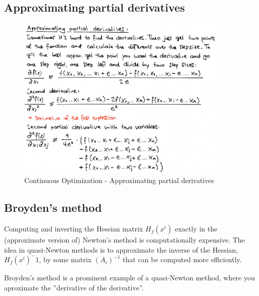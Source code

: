 \subsection{Approximating partial derivatives}

\begin{figure}[H]
\centering
\includegraphics[width=0.9\textwidth]{figures/approxDerivatives.png}
\caption{Continuous Optimization - Approximating partial derivatives}
\end{figure}

\subsection{Broyden's method}
Computing and inverting the Hessian matrix $H_f (x^i)$ exactly in
the (approximate version of) Newton’s method is computationally expensive.
The idea in quasi-Newton methods is to approximate the inverse of the Hessian, $H_f (x^i)^-1$, by some matrix $(A_i)^{-1}$ that can be computed more efficiently.

Broyden’s method is a prominent example of a quasi-Newton
method, where you aproximate the ”derivative of the derivative”.

